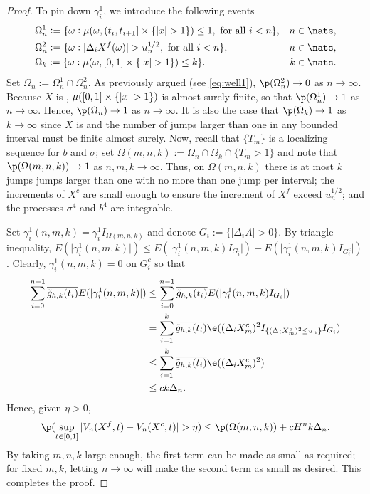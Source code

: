 \begin{proof}
To pin down $\gamma^1_i$, we introduce the following events
\begin{align}
&\Omega_n^1 := \{\omega : \mu(\omega,  (t_i, t_{i+1}] \times \{\vert x \vert > 1\} ) \le 1, \text{ for all } i <n  \}, & n \in \nats, \notag\\
&\Omega_n^2 := \{ \omega: \vert\Delta_i X^f(\omega)\vert > u_n^{1/2} , \text{ for all }i < n   \},& n \in \nats,\notag\\
&\Omega_k := \{\omega : \mu(\omega, \domain  \times \{\vert x \vert > 1\} ) \le k \}.  & k \in \nats.\notag
  \label{}
\end{align}
Set $\Omega_n := \Omega_n^1 \cap \Omega_n^2$.  As previously argued (see \eqref{eq:well1}), $\p(\Omega^2_n) \to 0$ as $n \to \infty$.  Because $X$ is \cadlag, $\mu(  [0,1] \times \{\vert x \vert > 1\} ) $ is almost surely finite, so that  $\p(\Omega^1_n) \to 1$ as $n \to \infty$.    Hence, $\p(\Omega_n) \to 1$ as $n \to \infty$. It is also the case that $\p(\Omega_k) \to 1$ as $k \to \infty$ since $X$ is \cadlag and the number of jumps larger than one in any bounded interval must be finite almost surely. Now, recall that $\{T_m \}$ is a localizing sequence for $b$ and $\sigma$;  set $\Omega(m,n,k) := \Omega_n \cap \Omega_k \cap \{T_m > 1\}$ and note that $\p(\Omega(m,n,k)) \to 1$ as $n,m, k \to \infty$.  Thus, on $\Omega(m,n,k)$ there is at most $k$ jumps jumps larger than  one with no more than one  jump per interval; the increments of $X^c$ are small enough to ensure the increment of $X^f$ exceed $u_n^{1/2}$; and the processes $\sigma^4$ and $b^4$ are integrable. 

Set $\gamma^1_i(n, m, k) = \gamma^1_i I_{\Omega(m,n,k)}$  and  denote  $G_i := \{\vert \Delta_i A\vert  > 0\}$. By triangle inequality,  $E(\vert \gamma_i^1(n, m, k) \vert) \le E(\vert \gamma_i^1(n, m, k)  I_{G_i}\vert)  + E(\vert \gamma_i^1(n,m, k) I_{G^c_i}\vert)$. Clearly, $\gamma^1_i(n,m, k) = 0$ on $G^c_i$  so that 
\begin{align}
\sum_{i =0}^{n-1} \btghki E(\vert \gamma_i^1(n,m, k) \vert) & \le\sum_{i =0}^{n-1} \btghki E(\vert \gamma_i^1(n,m, k) I_{G_i}\vert) \notag\\
 & =  \sum_{i =1}^{k} \btghki\e( (\dxc_m)^2 I_{\{(\dxc_m)^2 \le u_n\}}I_{G_i})\notag\\
 &\le \sum_{i =1}^{k} \btghki\e((\dxc_m)^2)\notag \\
 &\le c k \Delta_n\notag.
  \label{}
\end{align}
Hence, given $\eta > 0$, 
\begin{align}
  \p(\sup_{t \in \domain} \vert V_n(X^f,t)  - V_n(X^c, t) \vert > \eta) \le \p(\Omega(m,n,k)) + c H^n k \Delta_n.\notag
  \label{}
\end{align}
By taking $m,n,k$ large enough, the first term can be made as small as required; for fixed $m,k$, letting $n\to \infty$ will make the second term as small as desired. This completes the proof. 
\end{proof}
